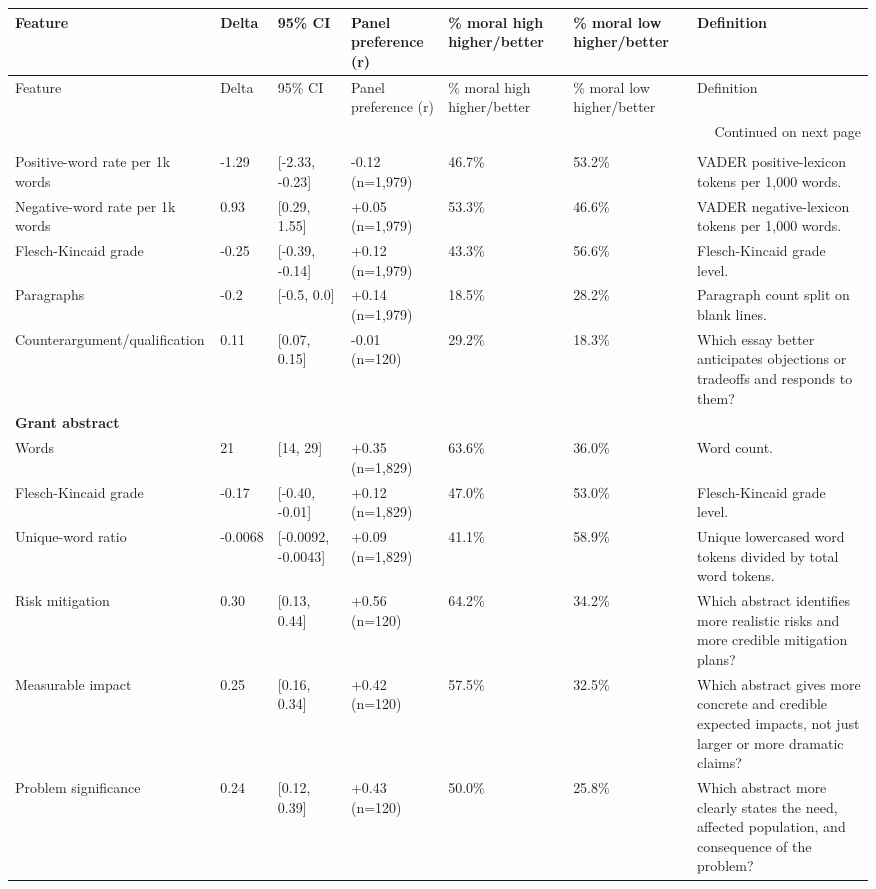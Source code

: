 \begin{longtable}{lllllll}
\toprule
Feature & Delta & 95\% CI & Panel preference (r) & \% moral high higher/better & \% moral low higher/better & Definition \\
\midrule
\endfirsthead
\toprule
Feature & Delta & 95\% CI & Panel preference (r) & \% moral high higher/better & \% moral low higher/better & Definition \\
\midrule
\endhead
\midrule
\multicolumn{7}{r}{Continued on next page} \\
\midrule
\endfoot
\bottomrule
\endlastfoot
\multicolumn{7}{l}{\textbf{Essay writing}} \\
Positive-word rate per 1k words & -1.29 & [-2.33, -0.23] & -0.12 (n=1,979) & 46.7\% & 53.2\% & VADER positive-lexicon tokens per 1,000 words. \\
Negative-word rate per 1k words & 0.93 & [0.29, 1.55] & +0.05 (n=1,979) & 53.3\% & 46.6\% & VADER negative-lexicon tokens per 1,000 words. \\
Flesch-Kincaid grade & -0.25 & [-0.39, -0.14] & +0.12 (n=1,979) & 43.3\% & 56.6\% & Flesch-Kincaid grade level. \\
Paragraphs & -0.2 & [-0.5, 0.0] & +0.14 (n=1,979) & 18.5\% & 28.2\% & Paragraph count split on blank lines. \\
Counterargument/qualification & 0.11 & [0.07, 0.15] & -0.01 (n=120) & 29.2\% & 18.3\% & Which essay better anticipates objections or tradeoffs and responds to them? \\
\multicolumn{7}{l}{\textbf{Grant abstract}} \\
Words & 21 & [14, 29] & +0.35 (n=1,829) & 63.6\% & 36.0\% & Word count. \\
Flesch-Kincaid grade & -0.17 & [-0.40, -0.01] & +0.12 (n=1,829) & 47.0\% & 53.0\% & Flesch-Kincaid grade level. \\
Unique-word ratio & -0.0068 & [-0.0092, -0.0043] & +0.09 (n=1,829) & 41.1\% & 58.9\% & Unique lowercased word tokens divided by total word tokens. \\
Risk mitigation & 0.30 & [0.13, 0.44] & +0.56 (n=120) & 64.2\% & 34.2\% & Which abstract identifies more realistic risks and more credible mitigation plans? \\
Measurable impact & 0.25 & [0.16, 0.34] & +0.42 (n=120) & 57.5\% & 32.5\% & Which abstract gives more concrete and credible expected impacts, not just larger or more dramatic claims? \\
Problem significance & 0.24 & [0.12, 0.39] & +0.43 (n=120) & 50.0\% & 25.8\% & Which abstract more clearly states the need, affected population, and consequence of the problem? \\

\end{longtable}
